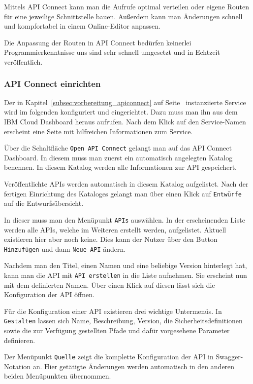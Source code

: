 Mittels API Connect kann man die Aufrufe optimal verteilen oder eigene Routen für eine jeweilige Schnittstelle bauen.
Außerdem kann man Änderungen schnell und kompfortabel in einem Online-Editor anpassen.

Die Anpassung der Routen in API Connect bedürfen keinerlei Programmierkenntnisse uns sind sehr schnell umgesetzt und in
Echtzeit veröffentlich.

\subsubsection{API Connect einrichten}
Der in Kapitel~\ref{subsec:vorbereitung_apiconnect} auf Seite~\pageref{subsec:vorbereitung_apiconnect} instanziierte
Service wird im folgenden konfiguriert und eingerichtet. Dazu muss man ihn aus dem IBM Cloud Dashboard heraus aufrufen.
Nach dem Klick auf den Service-Namen erscheint eine Seite mit hilfreichen Informationen zum Service.

Über die Schaltfläche \texttt{Open API Connect} gelangt man auf das API Connect Dashboard. In diesem muss man zuerst ein
automatisch angelegten Katalog benennen. In diesem Katalog werden alle Informationen zur API gespeichert.

Veröffentlichte APIs werden automatisch in diesem Katalog aufgelistet. Nach der fertigen Einrichtung des Kataloges gelangt
man über einen Klick auf \texttt{Entwürfe} auf die Entwurfsübersicht.

In dieser muss man den Menüpunkt \texttt{APIs} auswählen. In der erscheinenden Liste werden alle APIs, welche im Weiteren
erstellt werden, aufgelistet. Aktuell existieren hier aber noch keine. Dies kann der Nutzer über den Button
\texttt{Hinzufügen} und dann \texttt{Neue API} ändern.

Nachdem man den Titel, einen Namen und eine beliebige Version hinterlegt hat, kann man die API mit \texttt{API erstellen}
in die Liste aufnehmen. Sie erscheint nun mit dem definierten Namen. Über einen Klick auf diesen lässt sich die
Konfiguration der API öffnen.

Für die Konfiguration einer API existieren drei wichtige Untermenüs. In \texttt{Gestalten} lassen sich Name, Beschreibung,
Version, die Sicherheitsdefinitionen sowie die zur Verfügung gestellten Pfade und dafür vorgesehene Parameter definieren.

Der Menüpunkt \texttt{Quelle} zeigt die komplette Konfiguration der API in Swagger-Notation an. Hier getätigte Änderungen
werden automatisch in den anderen beiden Menüpunkten übernommen.

